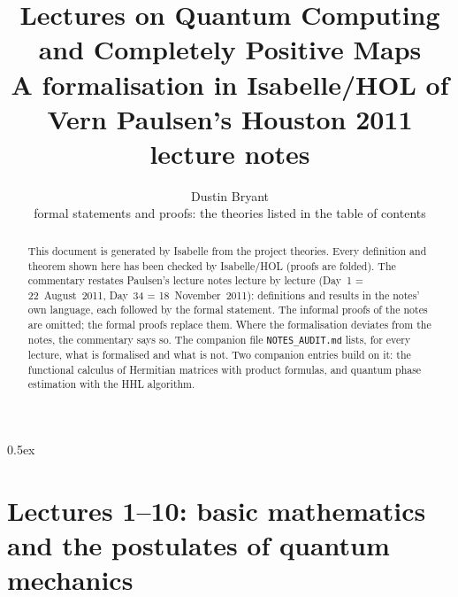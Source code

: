 \documentclass[11pt,a4paper]{article}
\theoremstyle{definition}
\begin{document}
\title{Lectures on Quantum Computing and Completely Positive Maps\\[0.5em]
  \large A formalisation in Isabelle/HOL of Vern Paulsen's Houston 2011 lecture notes}
\author{Dustin Bryant\\[0.3em]\small formal statements and proofs: the theories listed in the table of contents}
\maketitle

\begin{abstract}
This document is generated by Isabelle from the project theories.  Every
definition and theorem shown here has been checked by Isabelle/HOL (proofs are
folded).  The commentary restates Paulsen's lecture notes lecture by lecture
(Day~1 = 22~August~2011, Day~34 = 18~November~2011): definitions and results in
the notes' own language, each followed by the formal statement.  The informal
proofs of the notes are omitted; the formal proofs replace them.  Where the
formalisation deviates from the notes, the commentary says so.  The companion
file \texttt{NOTES\_AUDIT.md} lists, for every lecture, what is formalised and
what is not.  Two companion entries build on it: the functional calculus of Hermitian
matrices with product formulas, and quantum phase estimation with the HHL algorithm.
\end{abstract}

\tableofcontents
\newpage

\parindent 0pt\parskip 0.5ex



\part{Lectures 1--10: basic mathematics and the postulates of quantum mechanics}




















\end{document}
